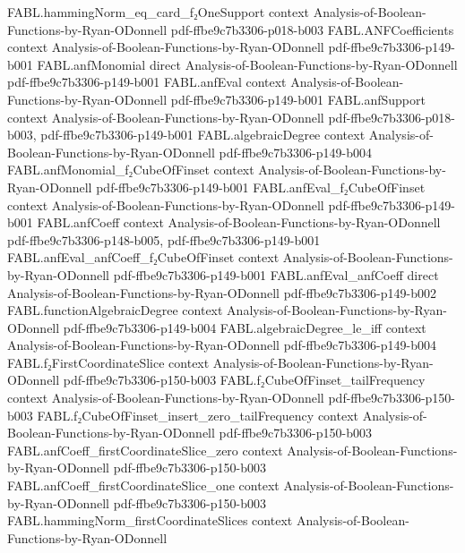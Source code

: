 \begin{theorem}
\proofstep
  {FABL.hammingNorm_eq_card_f₂OneSupport}
  {context}
  {Analysis-of-Boolean-Functions-by-Ryan-ODonnell}
  {pdf-ffbe9c7b3306-p018-b003}
\proofstep
  {FABL.ANFCoefficients}
  {context}
  {Analysis-of-Boolean-Functions-by-Ryan-ODonnell}
  {pdf-ffbe9c7b3306-p149-b001}
\proofstep
  {FABL.anfMonomial}
  {direct}
  {Analysis-of-Boolean-Functions-by-Ryan-ODonnell}
  {pdf-ffbe9c7b3306-p149-b001}
\proofstep
  {FABL.anfEval}
  {context}
  {Analysis-of-Boolean-Functions-by-Ryan-ODonnell}
  {pdf-ffbe9c7b3306-p149-b001}
\proofstep
  {FABL.anfSupport}
  {context}
  {Analysis-of-Boolean-Functions-by-Ryan-ODonnell}
  {pdf-ffbe9c7b3306-p018-b003,
    pdf-ffbe9c7b3306-p149-b001}
\proofstep
  {FABL.algebraicDegree}
  {context}
  {Analysis-of-Boolean-Functions-by-Ryan-ODonnell}
  {pdf-ffbe9c7b3306-p149-b004}
\proofstep
  {FABL.anfMonomial_f₂CubeOfFinset}
  {context}
  {Analysis-of-Boolean-Functions-by-Ryan-ODonnell}
  {pdf-ffbe9c7b3306-p149-b001}
\proofstep
  {FABL.anfEval_f₂CubeOfFinset}
  {context}
  {Analysis-of-Boolean-Functions-by-Ryan-ODonnell}
  {pdf-ffbe9c7b3306-p149-b001}
\proofstep
  {FABL.anfCoeff}
  {context}
  {Analysis-of-Boolean-Functions-by-Ryan-ODonnell}
  {pdf-ffbe9c7b3306-p148-b005,
    pdf-ffbe9c7b3306-p149-b001}
\proofstep
  {FABL.anfEval_anfCoeff_f₂CubeOfFinset}
  {context}
  {Analysis-of-Boolean-Functions-by-Ryan-ODonnell}
  {pdf-ffbe9c7b3306-p149-b001}
\proofstep
  {FABL.anfEval_anfCoeff}
  {direct}
  {Analysis-of-Boolean-Functions-by-Ryan-ODonnell}
  {pdf-ffbe9c7b3306-p149-b002}
\proofstep
  {FABL.functionAlgebraicDegree}
  {context}
  {Analysis-of-Boolean-Functions-by-Ryan-ODonnell}
  {pdf-ffbe9c7b3306-p149-b004}
\proofstep
  {FABL.algebraicDegree_le_iff}
  {context}
  {Analysis-of-Boolean-Functions-by-Ryan-ODonnell}
  {pdf-ffbe9c7b3306-p149-b004}
\proofstep
  {FABL.f₂FirstCoordinateSlice}
  {context}
  {Analysis-of-Boolean-Functions-by-Ryan-ODonnell}
  {pdf-ffbe9c7b3306-p150-b003}
\proofstep
  {FABL.f₂CubeOfFinset_tailFrequency}
  {context}
  {Analysis-of-Boolean-Functions-by-Ryan-ODonnell}
  {pdf-ffbe9c7b3306-p150-b003}
\proofstep
  {FABL.f₂CubeOfFinset_insert_zero_tailFrequency}
  {context}
  {Analysis-of-Boolean-Functions-by-Ryan-ODonnell}
  {pdf-ffbe9c7b3306-p150-b003}
\proofstep
  {FABL.anfCoeff_firstCoordinateSlice_zero}
  {context}
  {Analysis-of-Boolean-Functions-by-Ryan-ODonnell}
  {pdf-ffbe9c7b3306-p150-b003}
\proofstep
  {FABL.anfCoeff_firstCoordinateSlice_one}
  {context}
  {Analysis-of-Boolean-Functions-by-Ryan-ODonnell}
  {pdf-ffbe9c7b3306-p150-b003}
\proofstep
  {FABL.hammingNorm_firstCoordinateSlices}
  {context}
  {Analysis-of-Boolean-Functions-by-Ryan-ODonnell}

\end{theorem}
